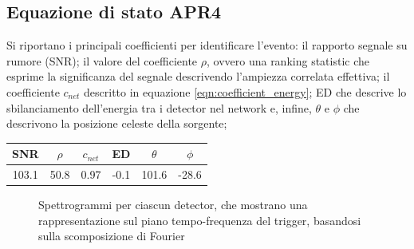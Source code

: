 \subsection{Equazione di stato APR4}
\label{subsection:APR4}
\begin{minipage}[c]{0.55\textwidth}
	Si riportano i principali coefficienti per identificare l'evento: il rapporto segnale su rumore (SNR); il valore del coefficiente $\rho$, ovvero una ranking statistic che esprime la significanza del segnale descrivendo l'ampiezza correlata effettiva; il coefficiente $c_{net}$ descritto in equazione \ref{eqn:coefficient_energy}; ED che descrive lo sbilanciamento dell'energia tra i detector nel network e, infine, $\theta$ e $\phi$ che descrivono la posizione celeste della sorgente;
\end{minipage}
\hspace{5mm}
\begin{tabular}{cccccc}
	\toprule
	SNR	&$\rho$	&$c_{net}$	&ED	&$\theta$	&$\phi$	\\
	\midrule
	103.1	&50.8	&0.97	&-0.1	&101.6	&-28.6	\\
	\bottomrule
\end{tabular}
\begin{figure}[H]
	\vspace{-20pt}
	\centering
	 \quad
	 \quad
	\vspace{-5pt}
	\caption{Spettrogrammi per ciascun detector, che mostrano una rappresentazione sul piano tempo-frequenza del trigger, basandosi sulla scomposizione di Fourier}
	\label{fig:spettrogramma_apr4}
	\vspace{-15pt}
\end{figure}

